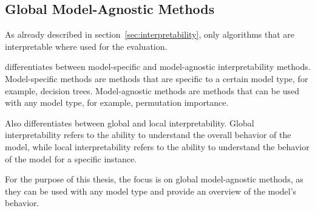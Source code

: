 \subsection*{Global Model-Agnostic Methods}
As already described in section~\ref{sec:interpretability}, only algorithms
that are
interpretable where used for the evaluation.

\cite{molnar2020interpretable} differentiates between
model-specific and model-agnostic interpretability methods.
Model-specific methods are methods that are specific to a certain model type, for example,
decision trees.
Model-agnostic methods are methods that can be used with any model type, for
example, permutation importance.

Also \cite{molnar2020interpretable} differentiates between global and local
interpretability. Global
interpretability refers to the ability to understand the overall behavior of
the model, while
local interpretability refers to the ability to understand the behavior of
the model for a
specific instance.

For the purpose of this thesis, the focus is on global model-agnostic
methods, as they can be used
with any model type and provide an overview of the model's behavior.


